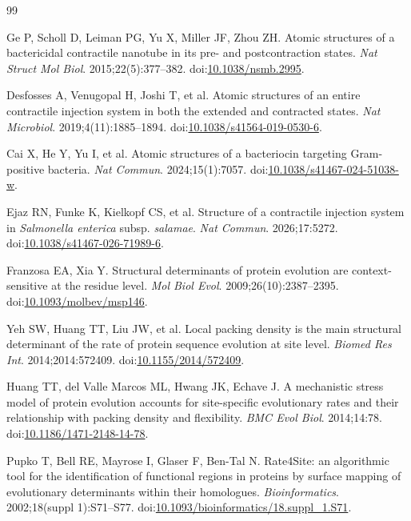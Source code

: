 \documentclass[11pt,a4paper]{article}
\begin{document}
\begin{thebibliography}{99}

Ge P, Scholl D, Leiman PG, Yu X, Miller JF, Zhou ZH. Atomic structures of a bactericidal contractile nanotube in its pre- and postcontraction states. \emph{Nat Struct Mol Biol}. 2015;22(5):377--382. doi:\href{https://doi.org/10.1038/nsmb.2995}{10.1038/nsmb.2995}.

Desfosses A, Venugopal H, Joshi T, et al. Atomic structures of an entire contractile injection system in both the extended and contracted states. \emph{Nat Microbiol}. 2019;4(11):1885--1894. doi:\href{https://doi.org/10.1038/s41564-019-0530-6}{10.1038/s41564-019-0530-6}.

Cai X, He Y, Yu I, et al. Atomic structures of a bacteriocin targeting Gram-positive bacteria. \emph{Nat Commun}. 2024;15(1):7057. doi:\href{https://doi.org/10.1038/s41467-024-51038-w}{10.1038/s41467-024-51038-w}.

Ejaz RN, Funke K, Kielkopf CS, et al. Structure of a contractile injection system in \emph{Salmonella enterica} subsp. \emph{salamae}. \emph{Nat Commun}. 2026;17:5272. doi:\href{https://doi.org/10.1038/s41467-026-71989-6}{10.1038/s41467-026-71989-6}.

Franzosa EA, Xia Y. Structural determinants of protein evolution are context-sensitive at the residue level. \emph{Mol Biol Evol}. 2009;26(10):2387--2395. doi:\href{https://doi.org/10.1093/molbev/msp146}{10.1093/molbev/msp146}.

Yeh SW, Huang TT, Liu JW, et al. Local packing density is the main structural determinant of the rate of protein sequence evolution at site level. \emph{Biomed Res Int}. 2014;2014:572409. doi:\href{https://doi.org/10.1155/2014/572409}{10.1155/2014/572409}.

Huang TT, del Valle Marcos ML, Hwang JK, Echave J. A mechanistic stress model of protein evolution accounts for site-specific evolutionary rates and their relationship with packing density and flexibility. \emph{BMC Evol Biol}. 2014;14:78. doi:\href{https://doi.org/10.1186/1471-2148-14-78}{10.1186/1471-2148-14-78}.

Pupko T, Bell RE, Mayrose I, Glaser F, Ben-Tal N. Rate4Site: an algorithmic tool for the identification of functional regions in proteins by surface mapping of evolutionary determinants within their homologues. \emph{Bioinformatics}. 2002;18(suppl 1):S71--S77. doi:\href{https://doi.org/10.1093/bioinformatics/18.suppl_1.S71}{10.1093/bioinformatics/18.suppl\_1.S71}.


\end{thebibliography}
\end{document}
